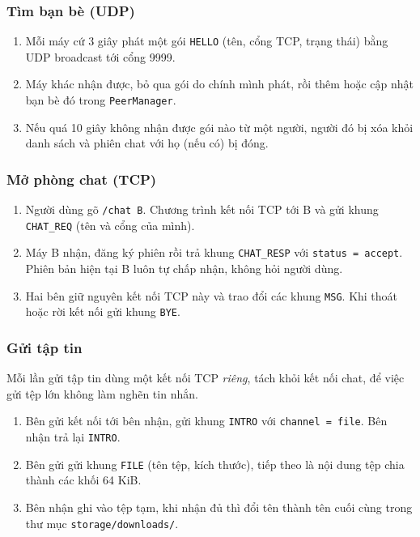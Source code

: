 \documentclass[a4paper,12pt]{article}
\newcommand{\code}[1]{\texttt{#1}}
\begin{document}
	\subsubsection{Tìm bạn bè (UDP)}
	\begin{enumerate}
		\item Mỗi máy cứ 3 giây phát một gói \code{HELLO} (tên, cổng TCP, trạng thái) bằng UDP broadcast tới cổng 9999.
		\item Máy khác nhận được, bỏ qua gói do chính mình phát, rồi thêm hoặc cập nhật bạn bè đó trong \code{PeerManager}.
		\item Nếu quá 10 giây không nhận được gói nào từ một người, người đó bị xóa khỏi danh sách và phiên chat với họ (nếu có) bị đóng.
	\end{enumerate}
	
	\subsubsection{Mở phòng chat (TCP)}
	\label{subsubsec:open_chat}
	\begin{enumerate}
		\item Người dùng gõ \code{/chat B}. Chương trình kết nối TCP tới B và gửi khung \code{CHAT\_REQ} (tên và cổng của mình).
		\item Máy B nhận, đăng ký phiên rồi trả khung \code{CHAT\_RESP} với \code{status = accept}. Phiên bản hiện tại B luôn tự chấp nhận, không hỏi người dùng.
		\item Hai bên giữ nguyên kết nối TCP này và trao đổi các khung \code{MSG}. Khi thoát hoặc rời kết nối gửi khung \code{BYE}.
	\end{enumerate}
	
	\subsubsection{Gửi tập tin}
	Mỗi lần gửi tập tin dùng một kết nối TCP \emph{riêng}, tách khỏi kết nối chat, để việc gửi tệp lớn không làm nghẽn tin nhắn.
	\begin{enumerate}
		\item Bên gửi kết nối tới bên nhận, gửi khung \code{INTRO} với \code{channel = file}. Bên nhận trả lại \code{INTRO}.
		\item Bên gửi gửi khung \code{FILE} (tên tệp, kích thước), tiếp theo là nội dung tệp chia thành các khối 64 KiB.
		\item Bên nhận ghi vào tệp tạm, khi nhận đủ thì đổi tên thành tên cuối cùng trong thư mục \code{storage/downloads/}.
	\end{enumerate}
	
\end{document}
